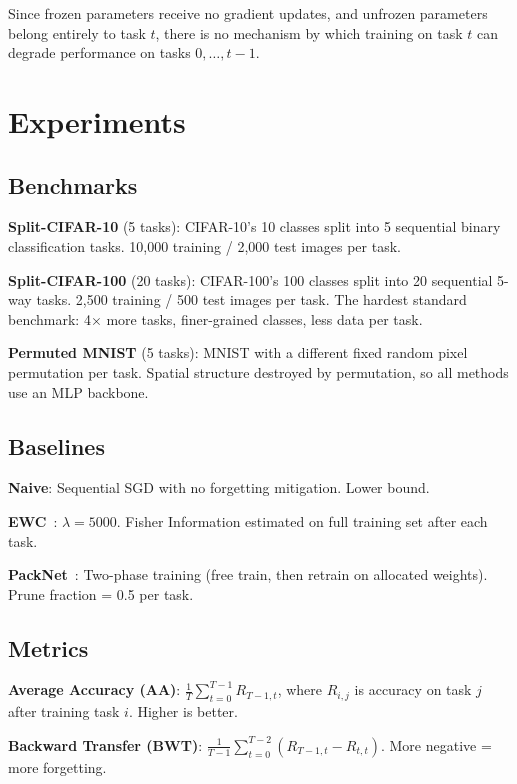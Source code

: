 \documentclass[10pt,twocolumn]{article}
\begin{document}
Since frozen parameters receive no gradient updates, and unfrozen parameters belong entirely to task $t$, there is no mechanism by which training on task $t$ can degrade performance on tasks $0, \ldots, t-1$.

\section{Experiments}

\subsection{Benchmarks}

\textbf{Split-CIFAR-10} (5 tasks): CIFAR-10's 10 classes split into 5 sequential binary classification tasks. 10,000 training / 2,000 test images per task.

\textbf{Split-CIFAR-100} (20 tasks): CIFAR-100's 100 classes split into 20 sequential 5-way tasks. 2,500 training / 500 test images per task. The hardest standard benchmark: 4$\times$ more tasks, finer-grained classes, less data per task.

\textbf{Permuted MNIST} (5 tasks): MNIST with a different fixed random pixel permutation per task. Spatial structure destroyed by permutation, so all methods use an MLP backbone.

\subsection{Baselines}

\textbf{Naive}: Sequential SGD with no forgetting mitigation. Lower bound.

\textbf{EWC}~\cite{ewc2017}: $\lambda = 5000$. Fisher Information estimated on full training set after each task.

\textbf{PackNet}~\cite{packnet2018}: Two-phase training (free train, then retrain on allocated weights). Prune fraction = 0.5 per task.

\subsection{Metrics}

\textbf{Average Accuracy (AA)}: $\frac{1}{T}\sum_{t=0}^{T-1} R_{T-1,t}$, where $R_{i,j}$ is accuracy on task $j$ after training task $i$. Higher is better.

\textbf{Backward Transfer (BWT)}: $\frac{1}{T-1}\sum_{t=0}^{T-2} (R_{T-1,t} - R_{t,t})$. More negative = more forgetting.
\end{document}

